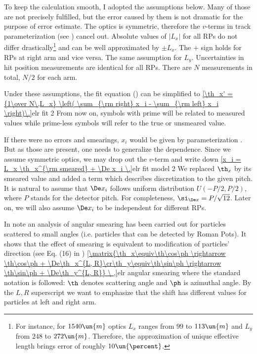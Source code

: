 To keep the calculation smooth, I adopted the assumptions below. Many of those are not precisely fulfilled, but the error caused by them is not dramatic for the purpose of error estimate.
\bitm
\itm The optics is symmetric, therefore the $v$-terms in track parameterization (see ) cancel out.
\itm Absolute values of $|L_x|$ for all RPs do not differ drastically\footnote{%
For instance, for $1540\un{m}$ optics $L_x$ ranges from $99$ to $113\un{m}$ and $L_y$ from $248$ to $272\un{m}$. Therefore, the approximation of unique effective length brings error of roughly $10\un{\percent}$.
}
and can be well approximated by $\pm L_x$. The $+$ sign holds for RPs at right arm and vice versa. The same assumption for $L_y$.
\itm Uncertainties in hit position measurements are identical for all RPs. 
\itm There are $N$ measurements in total, $N/2$ for each arm.
\eitm

\vskip2mm
Under these assumptions, the fit equation () can be simplified to
\eqref{\th_x' = {1\over N\,L_x} \left( \sum_{\rm right} x_i - \sum_{\rm left} x_i \right)\.}{elr fit 2}
From now on, symbols with prime will be related to measured values while prime-less symbols will refer to the true or unsmeared value. 

If there were no errors and smearings, $x_i$ would be given by parameterization . But as those are present, one needs to generalize the dependence. Since we assume symmetric optics, we may drop out the $v$-term and write down
\eqref{x_i = L_x \th_x^{\rm smeared} + \De x_i \.}{elr fit model 2}
We replaced $\th_x$ by its smeared value and added a term which describes discretization to the given pitch. It is natural to assume that $\De x_i$ follows uniform distribution $U(-P/2, P/2)$, where $P$ stands for the detector pitch. For completeness, $\si_{\De x} = P / \sqrt{12}$. Later on, we will also assume $\De x_i$ to be independent for different RPs.

In note  an analysis of angular smearing has been carried out for particles scattered to small angles (i.e. particles that can be detected by Roman Pots). It shows that the effect of smearing is equivalent to modification of particles' direction (see Eq. (16) in )
\eqref{\matrix{\th_x\equiv\th\cos\ph \rightarrow \th\cos\ph + \De\th_x^{L, R}\cr\th_y\equiv\th\sin\ph \rightarrow \th\sin\ph + \De\th_y^{L, R}}  \ ,}{elr angular smearing}
where the standard notation is followed: $\th$ denotes scattering angle and $\ph$ is azimuthal angle. By the $L, R$ superscript we want to emphasize that the shift has different values for particles at left and right arm.

